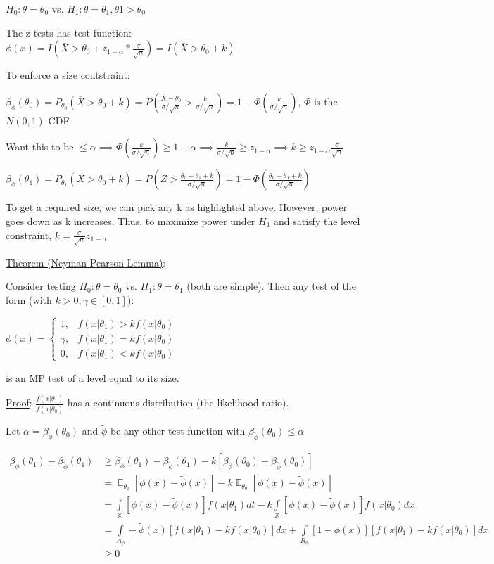 \documentclass{article}
\DeclareMathOperator{\EX}{\mathbb{E}} %
\let\Oldint=\int
\renewcommand{\int}{\Oldint\limits}
\begin{document}
$H_0: \theta = \theta_0$ vs. $H_1: \theta = \theta_1, \theta1 > \theta_0$

The z-tests has test function: $\phi(x) = I(\bar{X} > \theta_0 + z_{1-\alpha} * \frac{\sigma}{\sqrt{n}}) = I(\bar{X} > \theta_0 + k)$

To enforce a size contstraint:

$\beta_{\phi}(\theta_0) = P_{\theta_0}(\bar{X} > \theta_0 + k) = P(\frac{\bar{X} - \theta_0}{\sigma/\sqrt{n}} > \frac{k}{\sigma/\sqrt{n}}) = 1 - \Phi(\frac{k}{\sigma/\sqrt{n}})$, $\Phi$ is the $N(0, 1)$ CDF

Want this to be $\le \alpha \implies \Phi(\frac{k}{\sigma/\sqrt{n}}) \ge 1-\alpha \implies \frac{k}{\sigma/\sqrt{n}} \ge z_{1-\alpha} \implies k \ge z_{1-\alpha}\frac{\sigma}{\sqrt{n}}$

$\beta_{\phi}(\theta_1) = P_{\theta_1}(\bar{X} > \theta_0 + k) = P(Z > \frac{\theta_0 - \theta_1 + k}{\sigma/\sqrt{n}}) = 1 - \Phi(\frac{\theta_0 - \theta_1 + k}{\sigma/\sqrt{n}})$

To get a required size, we can pick any k as highlighted above. However, power goes down as k increases. Thus, to maximize power under $H_1$ and satisfy the level constraint, $k = \frac{\sigma}{\sqrt{n}}z_{1-\alpha}$

\underline{Theorem (Neyman-Pearson Lemma)}:

Consider testing $H_0:\theta = \theta_0$ vs. $H_1: \theta = \theta_1$ (both are simple). Then any test of the form (with $k > 0, \gamma \in [0,1]$):

$\phi(x) = \begin{cases} 1, & f(x|\theta_1) > kf(x|\theta_0) \\ \gamma, & f(x|\theta_1) = kf(x|\theta_0) \\ 0, & f(x|\theta_1) < kf(x|\theta_0) \end{cases}$

is an MP test of a level equal to its size. 

\underline{Proof}: $\frac{f(x|\theta_1)}{f(x|\theta_0)}$ has a continuous distribution (the likelihood ratio).

Let $\alpha = \beta_{\phi}(\theta_0)$ and $\tilde{\phi}$ be any other test function with $\beta_{\tilde{\phi}}(\theta_0) \le \alpha$

$$
\begin{aligned}
\beta_{\phi}(\theta_1) - \beta_{\tilde{\phi}}(\theta_1) 
& \ge \beta_{\phi}(\theta_1) - \beta_{\tilde{\phi}}(\theta_1) - k[\beta_{\phi}(\theta_0) - \beta_{\tilde{\phi}}(\theta_0)] \\
& = \EX_{\theta_1}[\phi(x) - \tilde{\phi}(x)] - k\EX_{\theta_0}[\phi(x) - \tilde{\phi}(x)] \\
& = \int_{\mathbb{X}}[\phi(x) - \tilde{\phi}(x)]f(x|\theta_1)dt - k\int_{\mathbb{X}}[\phi(x) - \tilde{\phi}(x)]f(x|\theta_0)dx \\
& = \int_{A_{\phi}}-\tilde{\phi}(x)[f(x|\theta_1) - kf(x|\theta_0)]dx + \int_{R_{\phi}}[1-\phi(x)][f(x|\theta_1) - kf(x|\theta_0)]dx \\
& \ge 0
\end{aligned}
$$
\end{document}
